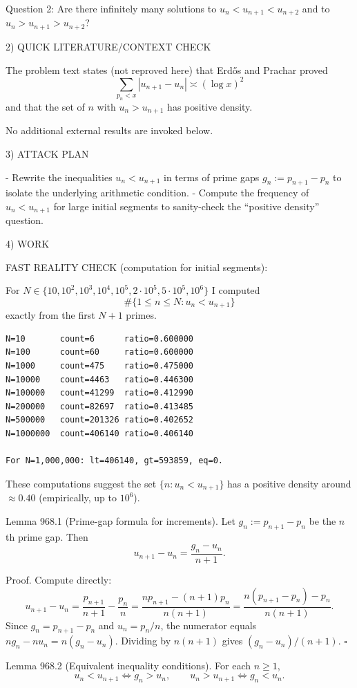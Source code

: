 Question 2: Are there infinitely many solutions to $u_n<u_{n+1}<u_{n+2}$ and to $u_n>u_{n+1}>u_{n+2}$?

2) QUICK LITERATURE/CONTEXT CHECK

The problem text states (not reproved here) that Erd\H{o}s and Prachar proved
\[
\sum_{p_n<x} |u_{n+1}-u_n| \asymp (\log x)^2
\]
and that the set of $n$ with $u_n>u_{n+1}$ has positive density.

No additional external results are invoked below.

3) ATTACK PLAN

- Rewrite the inequalities $u_n<u_{n+1}$ in terms of prime gaps $g_n:=p_{n+1}-p_n$ to isolate the underlying arithmetic condition.
- Compute the frequency of $u_n<u_{n+1}$ for large initial segments to sanity-check the “positive density” question.

4) WORK

FAST REALITY CHECK (computation for initial segments):

For $N\in\{10,10^2,10^3,10^4,10^5,2\cdot 10^5,5\cdot 10^5,10^6\}$ I computed
\[
\#\{1\le n\le N: u_n<u_{n+1}\}
\]
exactly from the first $N+1$ primes.

\begin{verbatim}
N=10       count=6      ratio=0.600000
N=100      count=60     ratio=0.600000
N=1000     count=475    ratio=0.475000
N=10000    count=4463   ratio=0.446300
N=100000   count=41299  ratio=0.412990
N=200000   count=82697  ratio=0.413485
N=500000   count=201326 ratio=0.402652
N=1000000  count=406140 ratio=0.406140

For N=1,000,000: lt=406140, gt=593859, eq=0.
\end{verbatim}

These computations suggest the set $\{n:u_n<u_{n+1}\}$ has a positive density around $\approx 0.40$ (empirically, up to $10^6$).

Lemma 968.1 (Prime-gap formula for increments).
Let $g_n:=p_{n+1}-p_n$ be the $n$th prime gap. Then
\[
 u_{n+1}-u_n = \frac{g_n-u_n}{n+1}.
\]

Proof.
Compute directly:
\[
 u_{n+1}-u_n = \frac{p_{n+1}}{n+1}-\frac{p_n}{n}
=\frac{n p_{n+1}-(n+1)p_n}{n(n+1)}
=\frac{n(p_{n+1}-p_n)-p_n}{n(n+1)}.
\]
Since $g_n=p_{n+1}-p_n$ and $u_n=p_n/n$, the numerator equals $n g_n - n u_n = n(g_n-u_n)$. Dividing by $n(n+1)$ gives $(g_n-u_n)/(n+1)$. $\square$

Lemma 968.2 (Equivalent inequality conditions).
For each $n\ge 1$,
\[
 u_n<u_{n+1}\iff g_n>u_n,
\qquad
 u_n>u_{n+1}\iff g_n<u_n.
\]

